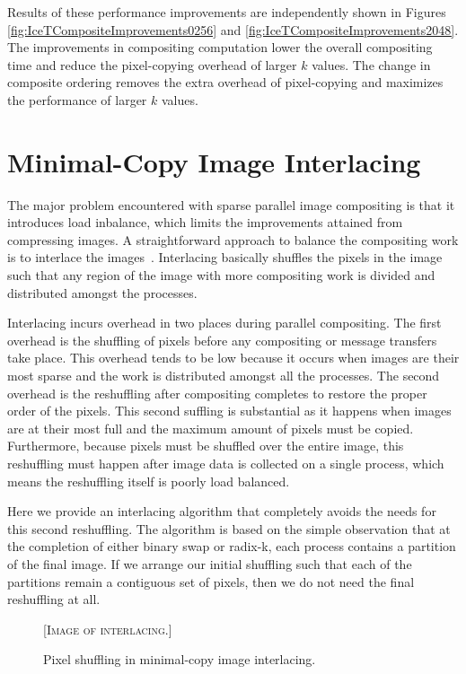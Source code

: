 \documentclass{vgtc}                          %
\newcommand*{\lcite}[1]{~\cite{#1}}
\newcommand{\sticky}[1]{{\color{red}\textsc{[#1]}}}
\begin{document}
Results of these performance improvements are independently shown in
Figures \ref{fig:IceTCompositeImprovements0256} and
\ref{fig:IceTCompositeImprovements2048}.  The improvements in compositing
computation lower the overall compositing time and reduce the pixel-copying
overhead of larger $k$ values.  The change in composite ordering removes
the extra overhead of pixel-copying and maximizes the performance of larger
$k$ values.

\section{Minimal-Copy Image Interlacing}
\label{sec:ImageInterlacing}

The major problem encountered with sparse parallel image compositing is
that it introduces load inbalance, which limits the improvements attained
from compressing images.  A straightforward approach to balance the
compositing work is to interlace the
images\lcite{Molnar1994,Takeuchi2003}.  Interlacing basically shuffles the
pixels in the image such that any region of the image with more compositing
work is divided and distributed amongst the processes.

Interlacing incurs overhead in two places during parallel compositing.  The
first overhead is the shuffling of pixels before any compositing or message
transfers take place.  This overhead tends to be low because it occurs when
images are their most sparse and the work is distributed amongst all the
processes.  The second overhead is the reshuffling after compositing
completes to restore the proper order of the pixels.  This second suffling
is substantial as it happens when images are at their most full and the
maximum amount of pixels must be copied.  Furthermore, because pixels must
be shuffled over the entire image, this reshuffling must happen after image
data is collected on a single process, which means the reshuffling itself
is poorly load balanced.

Here we provide an interlacing algorithm that completely avoids the needs
for this second reshuffling.  The algorithm is based on the simple
observation that at the completion of either binary swap or radix-k, each
process contains a partition of the final image.  If we arrange our initial
shuffling such that each of the partitions remain a contiguous set of
pixels, then we do not need the final reshuffling at all.

\begin{figure}[htbp]
  \centering
  \sticky{Image of interlacing.}
  \caption{Pixel shuffling in minimal-copy image interlacing.}
  \label{fig:Interlacing}
\end{figure}
\end{document}
